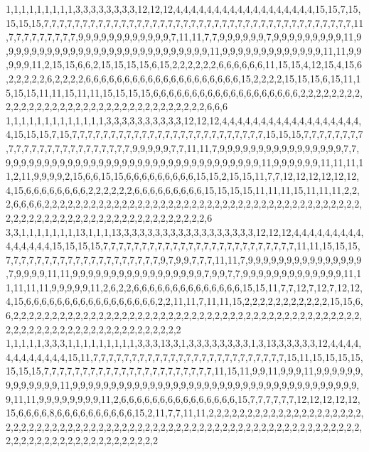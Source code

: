 1,1,1,1,1,1,1,1,1,3,3,3,3,3,3,3,3,12,12,12,4,4,4,4,4,4,4,4,4,4,4,4,4,4,4,4,4,4,15,15,7,15,15,15,15,7,7,7,7,7,7,7,7,7,7,7,7,7,7,7,7,7,7,7,7,7,7,7,7,7,7,7,7,7,7,7,7,7,7,7,7,7,7,7,7,11,7,7,7,7,7,7,7,7,7,9,9,9,9,9,9,9,9,9,9,9,9,7,11,11,7,7,9,9,9,9,9,9,7,9,9,9,9,9,9,9,9,9,11,9,9,9,9,9,9,9,9,9,9,9,9,9,9,9,9,9,9,9,9,9,9,9,9,9,9,9,11,9,9,9,9,9,9,9,9,9,9,9,9,9,11,11,9,9,9,9,9,11,2,15,15,6,6,2,15,15,15,15,6,15,2,2,2,2,2,2,6,6,6,6,6,6,11,15,15,4,12,15,4,15,6,2,2,2,2,2,6,2,2,2,2,6,6,6,6,6,6,6,6,6,6,6,6,6,6,6,6,6,6,6,6,15,2,2,2,2,15,15,15,6,15,11,15,15,15,11,11,15,11,11,15,15,15,15,6,6,6,6,6,6,6,6,6,6,6,6,6,6,6,6,6,6,6,2,2,2,2,2,2,2,2,2,2,2,2,2,2,2,2,2,2,2,2,2,2,2,2,2,2,2,2,2,2,2,2,2,2,6,6,6
1,1,1,1,1,1,1,1,1,1,1,1,1,3,3,3,3,3,3,3,3,3,3,12,12,12,4,4,4,4,4,4,4,4,4,4,4,4,4,4,4,4,4,4,4,15,15,15,7,15,7,7,7,7,7,7,7,7,7,7,7,7,7,7,7,7,7,7,7,7,7,7,7,7,7,15,15,15,7,7,7,7,7,7,7,7,7,7,7,7,7,7,7,7,7,7,7,7,7,7,7,7,9,9,9,9,9,7,7,11,11,7,9,9,9,9,9,9,9,9,9,9,9,9,9,9,9,9,7,7,9,9,9,9,9,9,9,9,9,9,9,9,9,9,9,9,9,9,9,9,9,9,9,9,9,9,9,9,9,9,9,9,9,11,9,9,9,9,9,9,11,11,11,11,2,11,9,9,9,9,2,15,6,6,15,15,6,6,6,6,6,6,6,6,6,15,15,2,15,15,11,7,7,12,12,12,12,12,12,4,15,6,6,6,6,6,6,6,6,2,2,2,2,2,2,6,6,6,6,6,6,6,6,6,15,15,15,15,11,11,11,15,11,11,11,2,2,2,6,6,6,6,2,2,2,2,2,2,2,2,2,2,2,2,2,2,2,2,2,2,2,2,2,2,2,2,2,2,2,2,2,2,2,2,2,2,2,2,2,2,2,2,2,2,2,2,2,2,2,2,2,2,2,2,2,2,2,2,2,2,2,2,2,2,2,2,2,2,2,6
3,3,1,1,1,1,1,1,1,13,1,1,1,13,3,3,3,3,3,3,3,3,3,3,3,3,3,3,3,3,3,12,12,12,4,4,4,4,4,4,4,4,4,4,4,4,4,4,4,15,15,15,15,7,7,7,7,7,7,7,7,7,7,7,7,7,7,7,7,7,7,7,7,7,7,7,7,7,11,11,15,15,15,7,7,7,7,7,7,7,7,7,7,7,7,7,7,7,7,7,7,7,7,9,7,9,9,7,7,7,11,11,7,9,9,9,9,9,9,9,9,9,9,9,9,9,9,9,7,9,9,9,9,11,11,9,9,9,9,9,9,9,9,9,9,9,9,9,9,9,9,9,7,9,9,7,7,9,9,9,9,9,9,9,9,9,9,9,9,9,11,11,11,11,11,9,9,9,9,9,11,2,6,2,2,6,6,6,6,6,6,6,6,6,6,6,6,6,6,15,15,11,7,7,12,7,12,7,12,12,4,15,6,6,6,6,6,6,6,6,6,6,6,6,6,6,6,6,6,2,2,11,11,7,11,11,15,2,2,2,2,2,2,2,2,2,2,2,15,15,6,6,2,2,2,2,2,2,2,2,2,2,2,2,2,2,2,2,2,2,2,2,2,2,2,2,2,2,2,2,2,2,2,2,2,2,2,2,2,2,2,2,2,2,2,2,2,2,2,2,2,2,2,2,2,2,2,2,2,2,2,2,2,2,2,2,2,2,2,2
1,1,1,1,1,3,3,3,1,1,1,1,1,1,1,1,1,3,3,3,13,3,1,3,3,3,3,3,3,3,3,1,3,13,3,3,3,3,3,12,4,4,4,4,4,4,4,4,4,4,4,4,15,11,7,7,7,7,7,7,7,7,7,7,7,7,7,7,7,7,7,7,7,7,7,7,7,7,7,15,11,15,15,15,15,15,15,15,7,7,7,7,7,7,7,7,7,7,7,7,7,7,7,7,7,7,7,7,7,7,11,15,11,9,9,11,9,9,9,11,9,9,9,9,9,9,9,9,9,9,9,9,9,11,9,9,9,9,9,9,9,9,9,9,9,9,9,9,9,9,9,9,9,9,9,9,9,9,9,9,9,9,9,9,9,9,9,9,9,9,9,9,11,11,9,9,9,9,9,9,9,9,11,2,6,6,6,6,6,6,6,6,6,6,6,6,6,6,6,15,7,7,7,7,7,7,12,12,12,12,12,15,6,6,6,6,8,6,6,6,6,6,6,6,6,6,6,15,2,11,7,7,11,11,2,2,2,2,2,2,2,2,2,2,2,2,2,2,2,2,2,2,2,2,2,2,2,2,2,2,2,2,2,2,2,2,2,2,2,2,2,2,2,2,2,2,2,2,2,2,2,2,2,2,2,2,2,2,2,2,2,2,2,2,2,2,2,2,2,2,2,2,2,2,2,2,2,2,2,2,2,2,2,2,2,2,2,2,2,2
